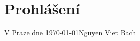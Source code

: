 
\vspace*{\fill}
\section*{Prohlášení}
%
\lipsum[1]
\lipsum[2]
\vspace{2cm}
\begin{flushright}
\underline{\hspace{5cm}}
\end{flushright}
V Praze dne \today \hfill Nguyen Viet Bach
\newpage
